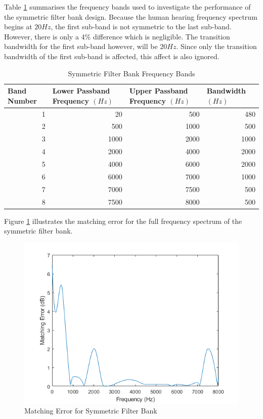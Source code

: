 \documentclass[12pt, onecolumn]{article}
\begin{document}
\begin{appendices}
\noindent Table \ref{tab:symFreqBand} summarises the frequency bands used to investigate the performance of the symmetric filter bank design. Because the human hearing frequency spectrum begins at $20Hz$, the first sub-band is not symmetric to the last sub-band. However, there is only a $4\%$ difference which is negligible. The transition bandwidth for the first sub-band however, will be $20Hz$. Since only the transition bandwidth of the first sub-band is affected, this affect is also ignored.

\begin{table}[htbp]
  \centering
  \caption{Symmetric Filter Bank Frequency Bands}
  \begin{adjustbox}{width=0.9\linewidth}
    \begin{tabular}{|r|r|r|r|}
    \hline
    \multicolumn{1}{|l|}{\textbf{Band Number}} & \multicolumn{1}{l|}{\textbf{Lower Passband Frequency $(Hz)$}} & \multicolumn{1}{l|}{\textbf{Upper Passband Frequency $(Hz)$}} & \multicolumn{1}{l|}{\textbf{Bandwidth $(Hz)$}} \\
    \hline
    1     & 20    & 500   & 480 \\
    \hline
    2     & 500   & 1000  & 500 \\
    \hline
    3     & 1000  & 2000  & 1000 \\
    \hline
    4     & 2000  & 4000  & 2000 \\
    \hline
    5     & 4000  & 6000  & 2000 \\
    \hline
    6     & 6000  & 7000  & 1000 \\
    \hline
    7     & 7000  & 7500  & 500 \\
    \hline
    8     & 7500  & 8000  & 500 \\
    \hline
    \end{tabular}%
    \end{adjustbox}
  \label{tab:symFreqBand}%
\end{table}%

\noindent Figure \ref{fig:symMatErr} illustrates the matching error for the full frequency spectrum of the symmetric filter bank.

\begin{figure}[h]
\centering
\includegraphics[width=0.6\linewidth]{symMatErr.PNG}
\caption{Matching Error for Symmetric Filter Bank}
\label{fig:symMatErr}
\end{figure}  



\end{appendices}
\end{document}
